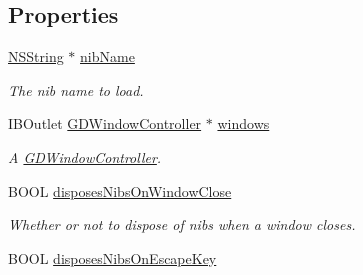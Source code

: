 \subsection*{Properties}
\begin{DoxyCompactItemize}
\item 
\hypertarget{interface_g_d_external_nib_controller_ac2584e757ad6b7eaa904ff76fe0df045}{
\hyperlink{class_n_s_string}{NSString} $\ast$ \hyperlink{interface_g_d_external_nib_controller_ac2584e757ad6b7eaa904ff76fe0df045}{nibName}}
\label{interface_g_d_external_nib_controller_ac2584e757ad6b7eaa904ff76fe0df045}

\begin{DoxyCompactList}\small\item\em The nib name to load. \item\end{DoxyCompactList}\item 
\hypertarget{interface_g_d_external_nib_controller_a351a4c9c5de180492de625d03cefcd1b}{
IBOutlet \hyperlink{interface_g_d_window_controller}{GDWindowController} $\ast$ \hyperlink{interface_g_d_external_nib_controller_a351a4c9c5de180492de625d03cefcd1b}{windows}}
\label{interface_g_d_external_nib_controller_a351a4c9c5de180492de625d03cefcd1b}

\begin{DoxyCompactList}\small\item\em A \hyperlink{interface_g_d_window_controller}{GDWindowController}. \item\end{DoxyCompactList}\item 
\hypertarget{interface_g_d_external_nib_controller_ae246403e91a5ec8366789981bc006806}{
BOOL \hyperlink{interface_g_d_external_nib_controller_ae246403e91a5ec8366789981bc006806}{disposesNibsOnWindowClose}}
\label{interface_g_d_external_nib_controller_ae246403e91a5ec8366789981bc006806}

\begin{DoxyCompactList}\small\item\em Whether or not to dispose of nibs when a window closes. \item\end{DoxyCompactList}\item 
\hypertarget{interface_g_d_external_nib_controller_ad5294163181c5c386e76b4b47a20cc0d}{
BOOL \hyperlink{interface_g_d_external_nib_controller_ad5294163181c5c386e76b4b47a20cc0d}{disposesNibsOnEscapeKey}}
\label{interface_g_d_external_nib_controller_ad5294163181c5c386e76b4b47a20cc0d}


\end{DoxyCompactItemize}
